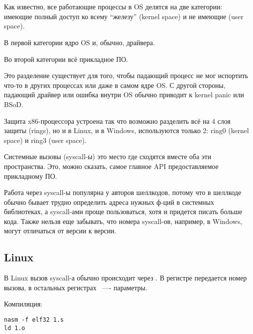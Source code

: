 ﻿\section{}


Как известно, все работающие процессы в \ac{OS} делятся на две категории: имеющие полный доступ
ко всему ``железу'' (kernel space) и не имеющие (user space).

В первой категории ядро \ac{OS} и, обычно, драйвера.

Во второй категории всё прикладное ПО.

Это разделение существует для того, чтобы падающий процесс не мог испортить что-то в других процессах
или даже в самом ядре \ac{OS}.
С другой стороны, падающий драйвер или ошибка внутри OS обычно приводит к kernel panic или BSoD.

Защита x86-процессора устроена так что возможно разделить всё на 4 слоя защиты (rings), но и в Linux,
и в Windows, используются только 2: ring0 (kernel space) и ring3 (user space).

Системные вызовы (syscall-ы) это место где сходятся вместе оба эти пространства.
Это, можно сказать, самое главное API предоставляемое прикладному ПО.

Работа через syscall-ы популярна у авторов шеллкодов, потому что в шеллкоде обычно бывает трудно определить
адреса нужных ф-ций в системных библиотеках, а syscall-ами проще пользоваться, хотя и придется писать больше
кода. Также нельзя еще забывать, что номера syscall-ов, например, в Windows, могут отличаться от версии к
версии.

\subsection{Linux}

В Linux вызов syscall-а обычно происходит через . В регистре \EAX передается номер вызова,
в остальных регистрах ~---- параметры.



Компиляция:

\begin{lstlisting}
nasm -f elf32 1.s
ld 1.o
\end{lstlisting}

